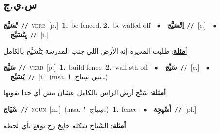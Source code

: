 \documentclass[10pt,a4paper,twoside]{article} %
\begin{document}
\begin{multicols}{2}
\vspace{-3mm}
\subsection*{\color{blue}\foreignlanguage{arabic}{س.ي.ج}\color{blue}{}} 

{\setlength\topsep{0pt}\textbf{\foreignlanguage{arabic}{تْسَيَّج}}\ {\color{gray}\texttt{//}\color{black}}\ \textsc{verb}\ [p.]\ \textbf{1.}~be fenced.  \textbf{2.}~be walled off\ \ $\bullet$\ \ \setlength\topsep{0pt}\textbf{\foreignlanguage{arabic}{اِتْسَيَّج}}\ {\color{gray}\texttt{//}\color{black}}\ [c.]\ \ $\bullet$\ \ \setlength\topsep{0pt}\textbf{\foreignlanguage{arabic}{يِتْسَيَّج}}\ {\color{gray}\texttt{//}\color{black}}\ [i.]\  \begin{flushright}\color{gray}\foreignlanguage{arabic}{\textbf{\underline{\foreignlanguage{arabic}{أمثلة}}}: طلبت المديرة إنه الأرض اللي جنب المدرسة تِتْسَيَّج بالكامل}\end{flushright}\color{black}} \vspace{2mm}

{\setlength\topsep{0pt}\textbf{\foreignlanguage{arabic}{سَيَّج}}\ {\color{gray}\texttt{//}\color{black}}\ \textsc{verb}\ [p.]\ \textbf{1.}~build fence.  \textbf{2.}~wall sth off\ \ $\bullet$\ \ \setlength\topsep{0pt}\textbf{\foreignlanguage{arabic}{سَيِّج}}\ {\color{gray}\texttt{//}\color{black}}\ [c.]\ \ $\bullet$\ \ \setlength\topsep{0pt}\textbf{\foreignlanguage{arabic}{يْسَيِّج}}\ {\color{gray}\texttt{//}\color{black}}\ [i.]\ \color{gray}(msa. \foreignlanguage{arabic}{يبني سِياج}~\foreignlanguage{arabic}{\textbf{١.}})\color{black}\  \begin{flushright}\color{gray}\foreignlanguage{arabic}{\textbf{\underline{\foreignlanguage{arabic}{أمثلة}}}: سَيِّج أرض الراس بالكامل عشان مش أي حدا يفوتها}\end{flushright}\color{black}} \vspace{2mm}

{\setlength\topsep{0pt}\textbf{\foreignlanguage{arabic}{سْيَاج}}\ {\color{gray}\texttt{//}\color{black}}\ \textsc{noun}\ [m.]\ \color{gray}(msa. \foreignlanguage{arabic}{سِياج}~\foreignlanguage{arabic}{\textbf{١.}})\color{black}\ \textbf{1.}~fence\ \ $\bullet$\ \ \setlength\topsep{0pt}\textbf{\foreignlanguage{arabic}{أَسْيِجِة}}\ {\color{gray}\texttt{//}\color{black}}\ [pl.]\  \begin{flushright}\color{gray}\foreignlanguage{arabic}{\textbf{\underline{\foreignlanguage{arabic}{أمثلة}}}: السْياج شكله خايِخ رح يوقع بأي لحظة}\end{flushright}\color{black}} \vspace{2mm}


\end{multicols}
\end{document}
